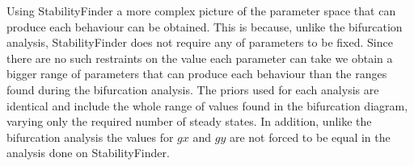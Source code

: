 Using StabilityFinder a more complex picture of the parameter space that can produce each behaviour can be obtained. This is because, unlike the bifurcation analysis, StabilityFinder does not require any of parameters to be fixed. Since there are no such restraints on the value each parameter can take we obtain a bigger range of parameters that can produce each behaviour than the ranges found during the bifurcation analysis. The priors used for each analysis are identical and include the whole range of values found in the bifurcation diagram, varying only the required number of steady states. In addition, unlike the bifurcation analysis the values for $gx$ and $gy$ are not forced to be equal in the analysis done on StabilityFinder.




